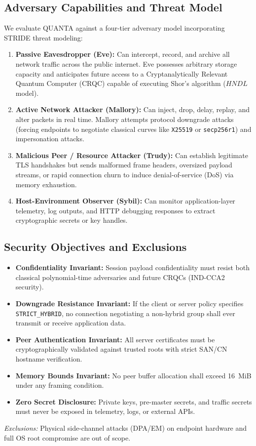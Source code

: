 \documentclass[conference]{IEEEtran}
\begin{document}
\subsection{Adversary Capabilities and Threat Model}
We evaluate QUANTA against a four-tier adversary model incorporating STRIDE threat modeling:
\begin{enumerate}
    \item \textbf{Passive Eavesdropper (Eve):} Can intercept, record, and archive all network traffic across the public internet. Eve possesses arbitrary storage capacity and anticipates future access to a Cryptanalytically Relevant Quantum Computer (CRQC) capable of executing Shor's algorithm ($HNDL$ model).
    \item \textbf{Active Network Attacker (Mallory):} Can inject, drop, delay, replay, and alter packets in real time. Mallory attempts protocol downgrade attacks (forcing endpoints to negotiate classical curves like \texttt{X25519} or \texttt{secp256r1}) and impersonation attacks.
    \item \textbf{Malicious Peer / Resource Attacker (Trudy):} Can establish legitimate TLS handshakes but sends malformed frame headers, oversized payload streams, or rapid connection churn to induce denial-of-service (DoS) via memory exhaustion.
    \item \textbf{Host-Environment Observer (Sybil):} Can monitor application-layer telemetry, log outputs, and HTTP debugging responses to extract cryptographic secrets or key handles.
\end{enumerate}

\subsection{Security Objectives and Exclusions}
\begin{itemize}
    \item \textbf{Confidentiality Invariant:} Session payload confidentiality must resist both classical polynomial-time adversaries and future CRQCs (IND-CCA2 security).
    \item \textbf{Downgrade Resistance Invariant:} If the client or server policy specifies \texttt{STRICT\_HYBRID}, no connection negotiating a non-hybrid group shall ever transmit or receive application data.
    \item \textbf{Peer Authentication Invariant:} All server certificates must be cryptographically validated against trusted roots with strict SAN/CN hostname verification.
    \item \textbf{Memory Bounds Invariant:} No peer buffer allocation shall exceed 16~MiB under any framing condition.
    \item \textbf{Zero Secret Disclosure:} Private keys, pre-master secrets, and traffic secrets must never be exposed in telemetry, logs, or external APIs.
\end{itemize}
\textit{Exclusions:} Physical side-channel attacks (DPA/EM) on endpoint hardware and full OS root compromise are out of scope.
\end{document}
